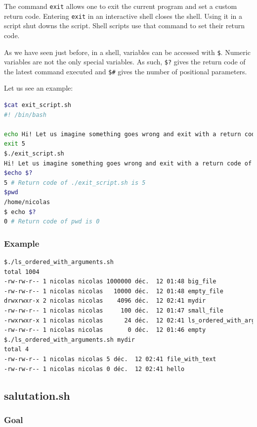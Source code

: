 \documentclass[12pt]{article}
\begin{document}
The command \texttt{exit} allows one to exit the current program and set a custom return code. Entering \texttt{exit} in an interactive shell closes the shell. Using it in a script shut downs the script. Shell scripts use that command to set their return code.

As we have seen just before, in a shell, variables can be accessed with \texttt{\$}. Numeric variables are not the only special variables. As such, \texttt{\$?} gives the return code of the latest command executed and \texttt{\$\#} gives the number of positional parameters.

Let us see an example:
\begin{lstlisting}[language=bash]
$cat exit_script.sh 
#! /bin/bash

echo Hi! Let us imagine something goes wrong and exit with a return code of 5
exit 5
$./exit_script.sh 
Hi! Let us imagine something goes wrong and exit with a return code of 5
$echo $?
5 # Return code of ./exit_script.sh is 5
$pwd
/home/nicolas
$ echo $?
0 # Return code of pwd is 0
\end{lstlisting}

\subsubsection{Example}

\begin{lstlisting}[language=bash]
$./ls_ordered_with_arguments.sh 
total 1004
-rw-rw-r-- 1 nicolas nicolas 1000000 déc.  12 01:48 big_file
-rw-rw-r-- 1 nicolas nicolas   10000 déc.  12 01:48 empty_file
drwxrwxr-x 2 nicolas nicolas    4096 déc.  12 02:41 mydir
-rw-rw-r-- 1 nicolas nicolas     100 déc.  12 01:47 small_file
-rwxrwxr-x 1 nicolas nicolas      24 déc.  12 02:41 ls_ordered_with_arguments.sh
-rw-rw-r-- 1 nicolas nicolas       0 déc.  12 01:46 empty
$./ls_ordered_with_arguments.sh mydir
total 4
-rw-rw-r-- 1 nicolas nicolas 5 déc.  12 02:41 file_with_text
-rw-rw-r-- 1 nicolas nicolas 0 déc.  12 02:41 hello
\end{lstlisting}


\subsection{salutation.sh}

\subsubsection{Goal}
\end{document}
